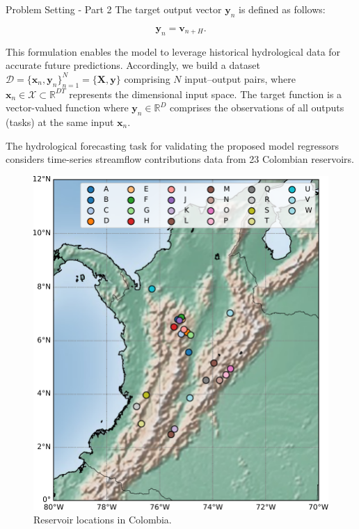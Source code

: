 \begin{frame}{Problem Setting - Part 2}
	The target output vector $\mathbf{y}_n$ is defined as follows:
	
	\begin{equation*}
	\mathbf{y}_n = \mathbf{v}_{n+H}.
	\end{equation*}
	
	This formulation enables the model to leverage historical hydrological data for accurate future predictions. Accordingly, we build a dataset $\mathcal{D} = \{\bm{x}_n, \bm{y}_n\}_{n=1}^N = \{\mathbf{X}, \mathbf{y}\}$ comprising $N$ input--output pairs, where $\bm{x}_n \in \mathcal{X}\subset \mathbb{R}^{DT}$ represents the dimensional input space. The target function is a vector-valued function where $\bm{y}_n \in \mathbb{R}^{D}$ comprises the observations of all outputs (tasks) at the same input $\bm{x}_n$.
\end{frame}

\begin{frame}
	The hydrological forecasting task for validating the proposed model regressors considers time-series streamflow contributions data from 23 Colombian reservoirs.
	\begin{figure}[htbp]
		\centering 
		\includegraphics[height=0.5\textwidth]{images/colombiamap.pdf}
		\caption{Reservoir locations in Colombia.}
	\end{figure}
\end{frame}

